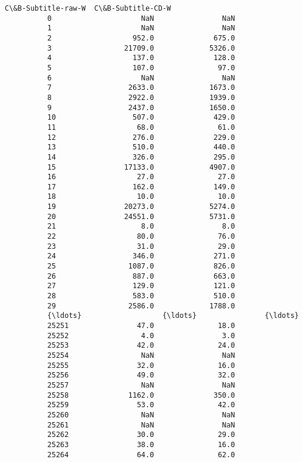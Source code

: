 \documentclass[11pt]{article}
\begin{document}
\begin{Verbatim}[commandchars=\\\{\}]
                 C\&B-Subtitle-raw-W  C\&B-Subtitle-CD-W  
          0                     NaN                NaN  
          1                     NaN                NaN  
          2                   952.0              675.0  
          3                 21709.0             5326.0  
          4                   137.0              128.0  
          5                   107.0               97.0  
          6                     NaN                NaN  
          7                  2633.0             1673.0  
          8                  2922.0             1939.0  
          9                  2437.0             1650.0  
          10                  507.0              429.0  
          11                   68.0               61.0  
          12                  276.0              229.0  
          13                  510.0              440.0  
          14                  326.0              295.0  
          15                17133.0             4907.0  
          16                   27.0               27.0  
          17                  162.0              149.0  
          18                   10.0               10.0  
          19                20273.0             5274.0  
          20                24551.0             5731.0  
          21                    8.0                8.0  
          22                   80.0               76.0  
          23                   31.0               29.0  
          24                  346.0              271.0  
          25                 1087.0              826.0  
          26                  887.0              663.0  
          27                  129.0              121.0  
          28                  583.0              510.0  
          29                 2586.0             1788.0  
          {\ldots}                   {\ldots}                {\ldots}  
          25251                47.0               18.0  
          25252                 4.0                3.0  
          25253                42.0               24.0  
          25254                 NaN                NaN  
          25255                32.0               16.0  
          25256                49.0               32.0  
          25257                 NaN                NaN  
          25258              1162.0              350.0  
          25259                53.0               42.0  
          25260                 NaN                NaN  
          25261                 NaN                NaN  
          25262                30.0               29.0  
          25263                38.0               16.0  
          25264                64.0               62.0  

\end{Verbatim}
\end{document}
